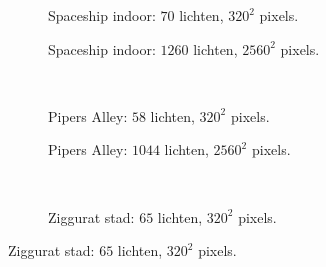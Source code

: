 \begin{figure}[t]
  \begin{adjustbox}{minipage=\textwidth, scale=0.6}
    \begin{subfigure}[b]{0.83\textwidth}
      \centering
      \def\svgwidth{\textwidth}
      
      \caption{Spaceship indoor: $70$ lichten, $320^2$ pixels.}
      \label{fig:ts-frames-forward:indoor-low}
    \end{subfigure}
  \end{adjustbox} %
  \begin{adjustbox}{minipage=\textwidth, scale=0.6}
    \begin{subfigure}[b]{0.83\textwidth}
      \centering
      \def\svgwidth{\textwidth}
      
      \caption{Spaceship indoor: $1260$ lichten, $2560^2$ pixels.}
      \label{fig:ts-frames-forward:indoor-high}
    \end{subfigure}
  \end{adjustbox} \\
  \begin{adjustbox}{minipage=\textwidth, scale=0.6}
    \begin{subfigure}[b]{0.83\textwidth}
      \centering
      \def\svgwidth{\textwidth}
      
      \caption{Pipers Alley: $58$ lichten, $320^2$ pixels.}
      \label{fig:ts-frames-forward:alley-low}
    \end{subfigure}
  \end{adjustbox} %
  \begin{adjustbox}{minipage=\textwidth, scale=0.6}
    \begin{subfigure}[b]{0.83\textwidth}
      \centering
      \def\svgwidth{\textwidth}
      
      \caption{Pipers Alley: $1044$ lichten, $2560^2$ pixels.}
      \label{fig:ts-frames-forward:alley-high}
    \end{subfigure}
  \end{adjustbox} \\
  \begin{adjustbox}{minipage=\textwidth, scale=0.6}
    \begin{subfigure}[b]{0.83\textwidth}
      \centering
      \def\svgwidth{\textwidth}
      
      \caption{Ziggurat stad: $65$ lichten, $320^2$ pixels.}

\end{subfigure}
\end{adjustbox}
\end{figure}
